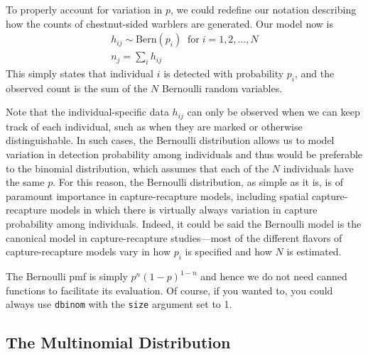 
To properly account for variation in $p$, we could redefine our notation
describing how the counts of chestnut-sided warblers are
generated. Our model now is
\begin{gather}
h_{ij} \sim \text{Bern}(p_i) \;\; \text{for} \; i=1,2,\dots,N \\
n_j = \sum_i h_{ij}
\label{modeling.eq.Bern}
\end{gather}
This simply states that individual $i$ is detected with probability
$p_i$, and the observed count is the sum of the $N$ Bernoulli random
variables.

Note that the individual-specific data $h_{ij}$ can only be
observed when we can keep track of each individual, such as when they
are marked or otherwise distinguishable.
In such cases, the Bernoulli distribution allows us to
model variation in detection probability among individuals and thus
would be preferable to the binomial distribution, which assumes that each
of the $N$ individuals have the same $p$.
For this reason, the Bernoulli
distribution, as simple as it is, is of paramount importance in
capture-recapture models, including spatial capture-recapture models
in which there is virtually always variation in capture probability
among individuals. Indeed, it could be said the Bernoulli model is the
canonical model in capture-recapture studies---most of the
different flavors of capture-recapture models vary in how $p_i$ is
specified and how $N$ is estimated.

The Bernoulli pmf is simply $p^n(1-p)^{1-n}$ and hence we do not need canned
functions to facilitate its evaluation. Of course, if you wanted to, you
could always use \verb+dbinom+ with the \verb+size+ argument set to
1.

\subsection{The Multinomial Distribution}


